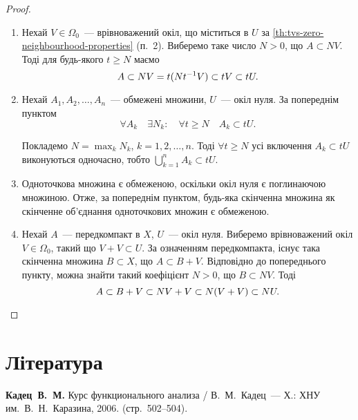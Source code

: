 \begin{proof}
    \listhack
    \begin{enumerate}
        \item Нехай $V \in \Omega_0$~--- врівноважений окіл, що міститься в $U$ за \cref{th:tvs-zero-neighbourhood-properties} (п.~2). Виберемо таке число $N > 0$, що $A \subset N V$. Тоді для будь-якого $t \ge N$ маємо
        \begin{equation*}
            A \subset N V = t(N t^{-1} V) \subset t V \subset t U.
        \end{equation*}

        \item Нехай $A_1, A_2, \dots, A_n$~--- обмежені множини, $U$~--- окіл нуля. За попереднім пунктом
        \begin{equation*}
            \forall A_k \quad \exists N_k: \quad \forall t \ge N \quad A_k \subset t U.
        \end{equation*}

        Покладемо $N = \max_k N_k$, $k = 1, 2, \dots, n$. Тоді $\forall t \ge N$ усі включення $A_k \subset t U$ виконуються одночасно, тобто $\bigcup_{k = 1}^n A_k \subset t U$.

        \item Одноточкова множина є обмеженою, оскільки окіл нуля є поглинаючою множиною. Отже, за попереднім пунктом, будь-яка скінченна множина як скінченне об'\-єд\-на\-ння одноточкових множин є обмеженою.

        \item Нехай $A$~--- передкомпакт в $X$, $U$~--- окіл нуля. Виберемо врівноважений окіл $V \in \Omega_0$, такий що $V + V \subset U$. За означенням передкомпакта, існує така скінченна множина $B \subset X$, що $A \subset B + V$. Відповідно до попереднього пункту, можна знайти такий коефіцієнт $N > 0$, що $B \subset N V$. Тоді
        \begin{equation*}
            A \subset B + V \subset NV + V \subset N(V + V) \subset N U. \qedhere
        \end{equation*}
    \end{enumerate}
\end{proof}

\section{Література}

\begin{enumerate}[label={[\arabic*]}]
\item \textbf{Кадец~В.~М.}
Курс функционального анализа /
В.~М.~Кадец~---
Х.: ХНУ им.~В.~Н.~Каразина, 2006. (стр.~502--504).
\end{enumerate}
